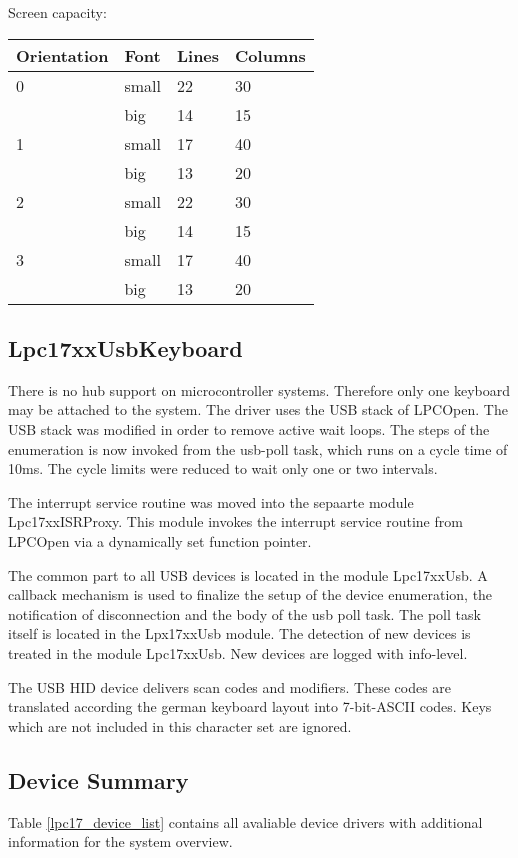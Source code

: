 Screen capacity:

\begin{tabular}{|l|l|l|l|}
\hline
Orientation & Font & Lines & Columns \\
\hline
 0 & small & 22 & 30  \\
   & big   & 14 & 15 \\
\hline
1 & small & 17 & 40 \\
  & big &   13 & 20 \\
\hline
 2 & small & 22 & 30  \\
   & big   & 14 & 15 \\
\hline
3 & small & 17 & 40 \\
  & big &   13 & 20 \\
\hline
\end{tabular}

\subsection{Lpc17xxUsbKeyboard}
There is no hub support on microcontroller systems. Therefore only one keyboard
may be attached to the system.
The driver uses the USB stack of LPCOpen.
The USB stack was modified in order to remove active wait loops.
The steps of the enumeration is now invoked from the usb-poll task, which
runs on a cycle time of 10ms. The cycle limits were reduced to wait only one 
or two intervals.

The interrupt service routine was moved into the sepaarte module Lpc17xxISRProxy. 
This module invokes the interrupt service routine from LPCOpen via a
 dynamically set function pointer.

The common part to all USB devices is located in the module Lpc17xxUsb. 
A callback mechanism is used to finalize the setup of the device enumeration,
the notification of disconnection and the body of the usb poll task. The poll task
itself is located in the Lpx17xxUsb module.
The detection of new devices is treated in the module Lpc17xxUsb. New devices are logged 
with info-level.

The USB HID device delivers scan codes and modifiers. These codes are translated according
the german keyboard layout into 7-bit-ASCII codes. Keys which are not included in this
character set are ignored.


\subsection{Device Summary}
Table \ref{lpc17_device_list} contains all avaliable device drivers 
with additional information for the system overview.

